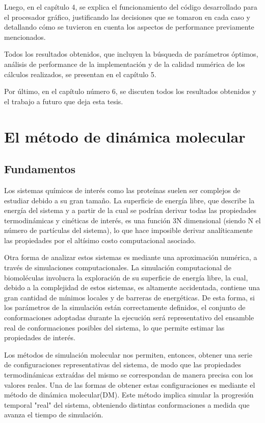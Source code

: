 Luego, en el capítulo 4, se explica el funcionamiento del código desarrollado para el procesador gráfico, justificando las decisiones que se tomaron en cada caso y detallando cómo se tuvieron en cuenta los aspectos de performance previamente mencionados. 

Todos los resultados obtenidos, que incluyen la búsqueda de parámetros óptimos, análisis de performance de la implementación y de la calidad numérica de los cálculos realizados, se presentan en el capítulo 5.

Por último, en el capítulo número 6, se discuten todos los resultados obtenidos y el trabajo a futuro que deja esta tesis.


\section{El método de dinámica molecular}

\subsection{Fundamentos}


Los sistemas químicos de interés como las proteínas suelen ser complejos de estudiar debido a su gran tamaño. 
La superficie de energía libre, que describe la energía del sistema y a partir de la cual se podrían derivar todas las propiedades termodinámicas y cinéticas de interés, es una función 3N dimensional (siendo N el número de partículas del sistema), lo que hace imposible derivar analíticamente las propiedades por el altísimo costo computacional asociado.

Otra forma de analizar estos sistemas es mediante una aproximación numérica, a través de simulaciones computacionales.  	
La simulación computacional de biomoléculas involucra la exploración de su superficie de energía libre, la cual, debido a la complejidad de estos sistemas, es altamente accidentada, contiene una gran cantidad de mínimos locales y de barreras de energéticas. 
De esta forma, si los parámetros de la simulación están correctamente definidos, el conjunto de conformaciones adoptadas durante la ejecución será representativo del ensamble real de conformaciones posibles del sistema, lo que permite estimar las propiedades de interés.

Los métodos de simulación molecular nos permiten, entonces, obtener una serie de configuraciones representativas del sistema, de modo que las propiedades termodinámicas extraídas del mismo se correspondan de manera precisa con los valores reales.
Una de las formas de obtener estas configuraciones es mediante el método de dinámica molecular(DM). Este método implica simular la progresión temporal "real" del sistema, obteniendo distintas conformaciones a medida que avanza el tiempo de simulación.

